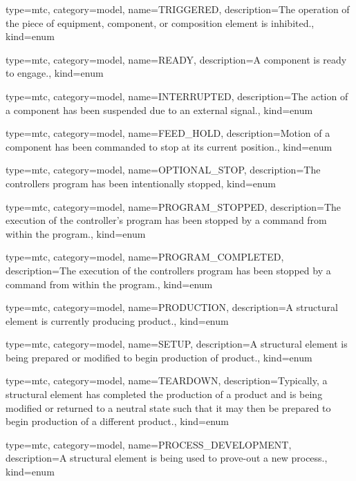 {
  type=mtc,
  category=model,
  name={TRIGGERED},
  description={The operation of the piece of equipment, component, or composition element is inhibited.},
  kind={enum}
}


{
  type=mtc,
  category=model,
  name={READY},
  description={A component is ready to engage.},
  kind={enum}
}


{
  type=mtc,
  category=model,
  name={INTERRUPTED},
  description={The action of a \gls{component} has been suspended due to an external signal.},
  kind={enum}
}


{
  type=mtc,
  category=model,
  name={FEED\_HOLD},
  description={Motion of a \gls{component} has been commanded to stop at its current position.},
  kind={enum}
}


{
  type=mtc,
  category=model,
  name={OPTIONAL\_STOP},
  description={The controllers program has been intentionally stopped},
  kind={enum}
}


{
  type=mtc,
  category=model,
  name={PROGRAM\_STOPPED},
  description={The execution of the \gls{controller}'s program has been stopped by a command from within the program.},
  kind={enum}
}


{
  type=mtc,
  category=model,
  name={PROGRAM\_COMPLETED},
  description={The execution of the controllers program has been stopped by a command from within the program.},
  kind={enum}
}


{
  type=mtc,
  category=model,
  name={PRODUCTION},
  description={A \gls{structural element} is currently producing product.},
  kind={enum}
}


{
  type=mtc,
  category=model,
  name={SETUP},
  description={A \gls{structural element} is being prepared or modified to begin production of product.},
  kind={enum}
}


{
  type=mtc,
  category=model,
  name={TEARDOWN},
  description={Typically, a \gls{structural element} has completed the production of a product and is being modified or returned to a neutral state such that it may then be prepared to begin production of a different product.},
  kind={enum}
}


{
  type=mtc,
  category=model,
  name={PROCESS\_DEVELOPMENT},
  description={A \gls{structural element} is being used to prove-out a new process.},
  kind={enum}
}


